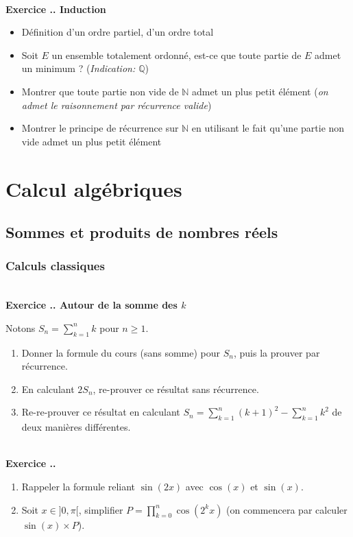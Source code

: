 \documentclass{article}
\newcommand{\mb}[1]{\mathbb{#1}}
\newcounter{exo}
\newcommand{\exercice}[1][\null]{\textbf{\\ Exercice \thesection.\theexo. #1} \addtocounter{exo}{1}}
\begin{document}
\exercice[Induction]

\begin{itemize}
    \item Définition d'un ordre partiel, d'un ordre total
    \item Soit $E$ un ensemble totalement ordonné, 
        est-ce que toute partie de $E$ admet un minimum ?
        (\emph{Indication: $\mb{Q}$}) 
    \item Montrer que toute partie non vide de $\mb{N}$ 
        admet un plus petit élément (\emph{on admet 
        le raisonnement par récurrence valide})
    \item Montrer le principe de récurrence sur $\mb{N}$
        en utilisant le fait qu'une partie non vide 
        admet un plus petit élément
\end{itemize}



\section{Calcul algébriques}

\subsection{Sommes et produits de nombres réels}

\subsubsection{Calculs classiques}


\exercice[Autour de la somme des $k$]

Notons $S_n = \sum_{k=1}^n k $ pour $n \ge 1$.

\begin{enumerate}

\item Donner la formule du cours (sans somme) pour $S_n$, puis la prouver par récurrence.

\item En calculant $2 S_n$, re-prouver ce résultat sans récurrence.

\item Re-re-prouver ce résultat en calculant $S_n = \sum_{k=1}^n (k+1)^2 -  \sum_{k=1}^n k^2  $ de deux manières différentes.
\end{enumerate}


\exercice

\begin{enumerate}

\item Rappeler la formule reliant $\sin(2x)$ avec $\cos(x)$ et $\sin(x)$.

\item Soit $x \in ]0, \pi [$, simplifier $P =\displaystyle \prod_{k=0}^n \cos(2^k x)$ (on commencera par calculer $ \sin (x) \times P$).

\end{enumerate}
\end{document}
